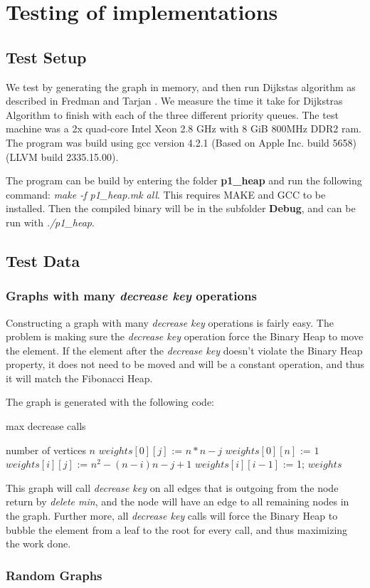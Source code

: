 \section*{Testing of implementations}
\subsection*{Test Setup}
  We test by generating the graph in memory, and then run Dijkstas algorithm as described in Fredman and Tarjan \cite{fibheap}. We measure the time it take for Dijkstras Algorithm to finish with each of the three different priority queues. The test machine was a 2x quad-core Intel Xeon 2.8 GHz with 8 GiB 800MHz DDR2 ram. The program was build using gcc version 4.2.1 (Based on Apple Inc. build 5658) (LLVM build 2335.15.00).

  The program can be build by entering the folder \textbf{p1\_heap} and run the following command: \textit{make -f p1\_heap.mk all}. This requires MAKE and GCC to be installed. Then the compiled binary will be in the subfolder \textbf{Debug}, and can be run with \textit{./p1\_heap}.

\subsection*{Test Data}
  \subsubsection*{Graphs with many \textit{decrease key} operations} 
    Constructing a graph with many \textit{decrease key} operations is fairly easy. The problem is making sure the \textit{decrease key} operation force the Binary Heap to move the element. If the element after the \textit{decrease key} doesn't violate the Binary Heap property, it does not need to be moved and will be a constant operation, and thus it will match the Fibonacci Heap.

    The graph is generated with the following code:
    \begin{algorithm}
      \caption{ max decrease calls}
      \begin{algorithmic}[1]
	\REQUIRE number of vertices $n$
	    \STATE $weights[0][j]$ := $n*n -j$
	  \ENDFOR
	  \STATE $weights[0][n]$ := $1$
	      \STATE $weights[i][j]$ := $n^2 - (n - i)n - j + 1$
	    \ENDFOR
	    \STATE $weights[i][i-1]$ := 1;
	  \ENDFOR
	\RETURN $weights$
\end{algorithmic}
\end{algorithm}

This graph will call \textit{decrease key} on all edges that is outgoing from the node return by \textit{delete min}, and the node will have an edge to all remaining nodes in the graph. Further more, all \textit{decrease key} calls will force the Binary Heap to bubble the element from a leaf to the root for every call, and thus maximizing the work done.
 \subsubsection*{Random Graphs}
